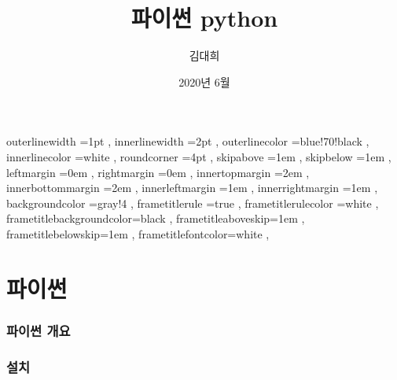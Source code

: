 \documentclass[12pt, a4paper, oneside]{book}
\let\stdsection\section
\renewcommand\section{\newpage\stdsection}
\begin{document}
	
			\dominitoc
			\doparttoc			




			\title{파이썬 python}
			\author{김대희}
			\date{2020년 6월}
			\maketitle


			\tableofcontents 		%
			\cleardoublepage
			\listoftables 			%





		 {
						outerlinewidth		=1pt			,%
						innerlinewidth		=2pt			,%
						outerlinecolor		=blue!70!black	,%
						innerlinecolor		=white 			,%
						roundcorner			=4pt			,%
						skipabove			=1em 			,%
						skipbelow			=1em 			,%
						leftmargin			=0em			,%
						rightmargin			=0em			,%
						innertopmargin		=2em 			,%
						innerbottommargin 	=2em 			,%
						innerleftmargin		=1em 			,%
						innerrightmargin		=1em 			,%
						backgroundcolor		=gray!4			,%
						frametitlerule		=true 			,%
						frametitlerulecolor	=white			,%
						frametitlebackgroundcolor=black		,%
						frametitleaboveskip=1em 			,%
						frametitlebelowskip=1em 			,%
						frametitlefontcolor=white 			,%
						}



	\part{파이썬 }
	\noptcrule
	\parttoc				


%
	\section{파이썬 개요}



	\section{ 설치}
\end{document}
